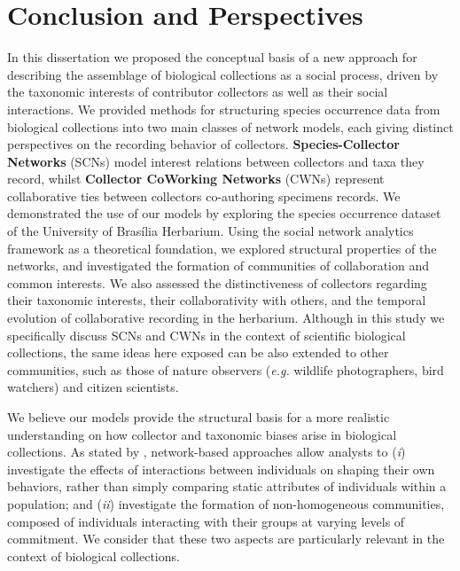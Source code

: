 \chapter{Conclusion and Perspectives}\label{conclusion_perspectives}
In this dissertation we proposed the conceptual basis of a new approach for describing the assemblage of biological collections as a social process, driven by the taxonomic interests of contributor collectors as well as their social interactions.
We provided methods for structuring species occurrence data from biological collections into two main classes of network models, each giving distinct perspectives on the recording behavior of collectors.
\textbf{Species-Collector Networks} (SCNs) model interest relations between collectors and taxa they record, whilst \textbf{Collector CoWorking Networks} (CWNs) represent collaborative ties between collectors co-authoring specimens records. 
We demonstrated the use of our models by exploring the species occurrence dataset of the University of Brasília Herbarium.
Using the social network analytics framework \cite{Barbier2011,Stork2015} as a theoretical foundation, we explored structural properties of the networks, 
and investigated the formation of communities of collaboration and common interests.
We also assessed the distinctiveness of collectors regarding their taxonomic interests, their collaborativity with others, and the temporal evolution of collaborative recording in the herbarium.
Although in this study we specifically discuss SCNs and CWNs in the context of scientific biological collections, the same ideas here exposed can be also extended to other communities, such as those of nature observers (\textit{e.g.} wildlife photographers, bird watchers) and citizen scientists.


We believe our models provide the structural basis for a more realistic understanding on how collector and taxonomic biases arise in biological collections. 
As stated by , network-based approaches allow analysts to
(\textit{i}) investigate the effects of interactions between individuals on shaping their own behaviors, rather than simply comparing static attributes of individuals within a population; and
(\textit{ii}) investigate the formation of non-homogeneous communities, composed of individuals interacting with their groups at varying levels of commitment.
We consider that these two aspects are particularly relevant in the context of biological collections.

